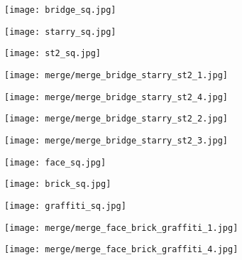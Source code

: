 \begin{figure}[H]
	\centering
	\begin{subfigure}[b]{0.13\linewidth}
		\texttt{[image: bridge\_sq.jpg]} %
	\end{subfigure}
	\begin{subfigure}[b]{0.13\linewidth}
		\texttt{[image: starry\_sq.jpg]} %
	\end{subfigure}
	\begin{subfigure}[b]{0.13\linewidth}
		\texttt{[image: st2\_sq.jpg]} %
	\end{subfigure}
	\begin{subfigure}[b]{0.13\linewidth}
		\texttt{[image: merge/merge\_bridge\_starry\_st2\_1.jpg]} %
	\end{subfigure}
	\begin{subfigure}[b]{0.13\linewidth}
		\texttt{[image: merge/merge\_bridge\_starry\_st2\_4.jpg]} %
	\end{subfigure}
	\begin{subfigure}[b]{0.13\linewidth}
		\texttt{[image: merge/merge\_bridge\_starry\_st2\_2.jpg]} %
	\end{subfigure}
	\begin{subfigure}[b]{0.13\linewidth}
		\texttt{[image: merge/merge\_bridge\_starry\_st2\_3.jpg]} %
	\end{subfigure}
	\centering
	\begin{subfigure}[b]{0.13\linewidth}
		\texttt{[image: face\_sq.jpg]} %
	\end{subfigure}
	\begin{subfigure}[b]{0.13\linewidth}
		\texttt{[image: brick\_sq.jpg]} %
	\end{subfigure}
	\begin{subfigure}[b]{0.13\linewidth}
		\texttt{[image: graffiti\_sq.jpg]} %
	\end{subfigure}
	\begin{subfigure}[b]{0.13\linewidth}
		\texttt{[image: merge/merge\_face\_brick\_graffiti\_1.jpg]} %
	\end{subfigure}
	\begin{subfigure}[b]{0.13\linewidth}
		\texttt{[image: merge/merge\_face\_brick\_graffiti\_4.jpg]} %

\end{subfigure}
\end{figure}
